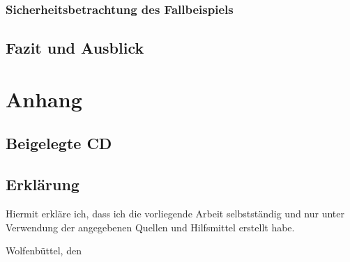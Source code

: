 \documentclass[
  a4paper,					    %
  twoside,
  DIV=calc,     				%
  bibliography=totoc,
  cleardoublepage=empty,
  ngerman,     					%
  final       					%
]{scrbook}
\begin{document}
\section{Sicherheitsbetrachtung des Fallbeispiels}
\label{sec:Sicherheit_Beispiel}











\chapter{Fazit und Ausblick}
\label{sec:FazitAusblick}











\appendix
\part*{Anhang}










\backmatter



\chapter{Beigelegte CD}
\label{sec:BeigelegteCD}



\chapter{Erklärung}
\label{sec:Erklärung}
Hiermit erkläre ich, dass ich die vorliegende Arbeit selbstständig und nur unter Verwendung der angegebenen Quellen und Hilfsmittel erstellt habe.
\vspace{2.5cm} \par
Wolfenbüttel, den %
\end{document}
